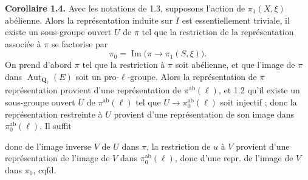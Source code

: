 \documentclass[11pt,a4paper]{article}
\begin{document}
\textbf{Corollaire 1.4.} Avec les notations de 1.3, supposons \struck{\ill{}} l'action de $\pi_1(X,\xi)$  \struck{\ill{}}  abélienne. Alors la représentation induite sur $I$ est essentiellement triviale, \struck{\ill{}}   il existe un sous-groupe \struck{\ill{}} ouvert  $U$ de $\pi$ tel que la restriction de la représentation \add{\ill{}} associée à $\pi$ \struck{\ill{}} se factorise par \ill{} \struck{\ill{}}
\[
\pi_0 = \operatorname{Im}\bigl(\pi \to \pi_1(S,\xi)\bigr) .
\]
 On prend \struck{\ill{}} d'abord $\pi$ tel que la restriction à $\pi$ soit abélienne, \struck{\ill{} \ill{}} et que \struck{\ill{} \ill{}} l'image de $\pi$ dans $\operatorname{Aut}_{\mathbf{Q}_\ell}(E)$ soit un pro-$\ell$-groupe. Alors la représentation de $\pi$ \ill{} représentation provient d'une représentation de $\pi^{\mathrm{ab}}(\ell)$, et  \add{\ill{}} 1.2 \ill{} \ill{} qu'il existe un sous-groupe ouvert $U$ de $\pi^{\mathrm{ab}}(\ell)$ tel que $U \to \pi_0^{\mathrm{ab}}(\ell)$ soit injectif ; donc la représentation restreinte à $U$ provient d'une représentation de son image dans $\pi_0^{\mathrm{ab}}(\ell)$. Il suffit

donc de   l'image inverse $V$ de $U$ dans $\pi$, la restriction de  $u$ à $V$ provient d'une représentation de l'image de $V$ dans $\pi_0^{\mathrm{ab}}(\ell)$, donc d'une repr. de l'image de $V$ dans $\pi_0$, cqfd.



\end{document}
